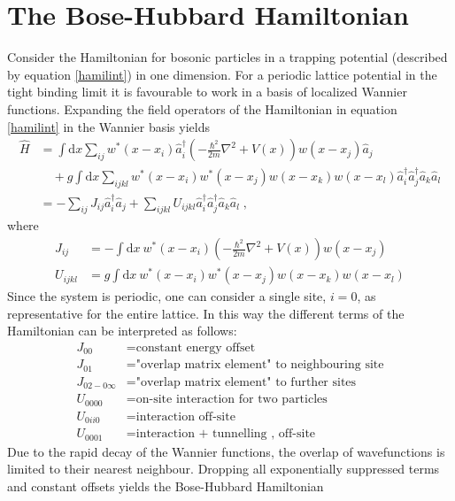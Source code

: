 \section{The Bose-Hubbard Hamiltonian}
Consider the Hamiltonian for bosonic particles in a trapping potential (described by equation \ref{hamilint}) in one dimension. For a periodic lattice potential in the tight binding limit it is favourable to work in a basis of localized Wannier functions. Expanding the field operators of the Hamiltonian in equation \ref{hamilint} in  the Wannier basis yields \cite{Jaksch}
\begin{align}
	\hat{H} &= \int \mathrm{d}x \sum_{i j} w^*(x-x_i) \hat{a}_{i}^{\dag} \left( - \frac{\hbar^2}{2 m} \nabla ^2 + V(x) \right) w(x-x_j) \hat{a}_j \nonumber \\
	& \quad + g \int \mathrm{d}x \sum_{i j k l} w^*(x-x_i) w^*(x-x_j) w(x-x_k) w(x-x_l) \hat{a}_{i}^{\dag} \hat{a}_{j}^{\dag} \hat{a}_{k} \hat{a}_{l} \\
	&= - \sum_{i j } J_{i j} \hat{a}_{i}^{\dag} \hat{a}_{j} + \sum_{i j k l} U_{i j k l} \hat{a}_{i}^{\dag} \hat{a}_{j}^{\dag} \hat{a}_{k} \hat{a}_{l} \; ,
\end{align}
where
\begin{align}
	J_{i j} &= - \int \mathrm{d}x \ w^*(x-x_i) \left( - \frac{\hbar^2}{2 m} \nabla ^2 + V(x) \right) w(x-x_j) \\
	U_{i j k l} &= g \int \mathrm{d}x \ w^*(x-x_i) w^*(x-x_j) w(x-x_k) w(x-x_l) 
\end{align}
Since the system is periodic, one can consider a single site, $i = 0$, as representative for the entire lattice. In this way the different terms of the Hamiltonian can be interpreted as follows:
\begin{align}
	J_{0 0} &= \text{constant energy offset} \nonumber \\
	J_{0 1} &= \text{"overlap matrix element" to neighbouring site} \nonumber \\
	J_{0 2 - 0 \infty} &= \text{"overlap matrix element" to further sites} \nonumber \\
	U_{0 0 0 0} &= \text{on-site interaction for two particles} \nonumber \\
	U_{0 i i 0} &= \text{interaction off-site} \nonumber \\
	U_{0 0 0 1} &= \text{interaction  + tunnelling , off-site} \nonumber 
\end{align}
Due to the rapid decay of the Wannier functions, the overlap of wavefunctions is limited to their nearest neighbour. Dropping all exponentially suppressed terms and constant offsets yields the Bose-Hubbard Hamiltonian
